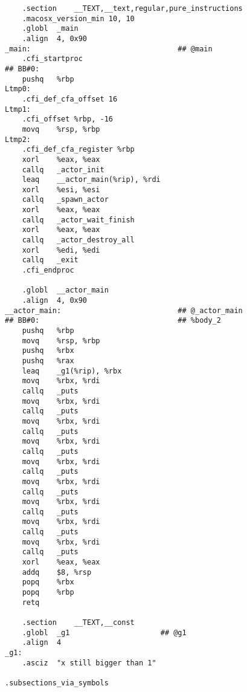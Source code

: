 \begin{verbatim}
	.section	__TEXT,__text,regular,pure_instructions
	.macosx_version_min 10, 10
	.globl	_main
	.align	4, 0x90
_main:                                  ## @main
	.cfi_startproc
## BB#0:
	pushq	%rbp
Ltmp0:
	.cfi_def_cfa_offset 16
Ltmp1:
	.cfi_offset %rbp, -16
	movq	%rsp, %rbp
Ltmp2:
	.cfi_def_cfa_register %rbp
	xorl	%eax, %eax
	callq	_actor_init
	leaq	__actor_main(%rip), %rdi
	xorl	%esi, %esi
	callq	_spawn_actor
	xorl	%eax, %eax
	callq	_actor_wait_finish
	xorl	%eax, %eax
	callq	_actor_destroy_all
	xorl	%edi, %edi
	callq	_exit
	.cfi_endproc

	.globl	__actor_main
	.align	4, 0x90
__actor_main:                           ## @_actor_main
## BB#0:                                ## %body_2
	pushq	%rbp
	movq	%rsp, %rbp
	pushq	%rbx
	pushq	%rax
	leaq	_g1(%rip), %rbx
	movq	%rbx, %rdi
	callq	_puts
	movq	%rbx, %rdi
	callq	_puts
	movq	%rbx, %rdi
	callq	_puts
	movq	%rbx, %rdi
	callq	_puts
	movq	%rbx, %rdi
	callq	_puts
	movq	%rbx, %rdi
	callq	_puts
	movq	%rbx, %rdi
	callq	_puts
	movq	%rbx, %rdi
	callq	_puts
	movq	%rbx, %rdi
	callq	_puts
	xorl	%eax, %eax
	addq	$8, %rsp
	popq	%rbx
	popq	%rbp
	retq

	.section	__TEXT,__const
	.globl	_g1                     ## @g1
	.align	4
_g1:
	.asciz	"x still bigger than 1"

.subsections_via_symbols
\end{verbatim}